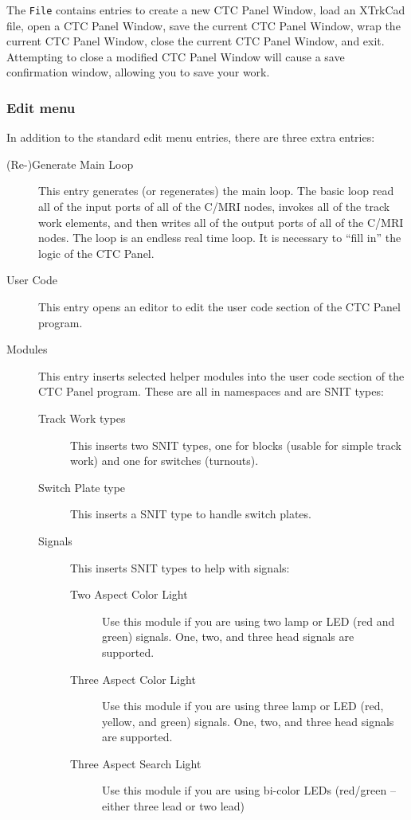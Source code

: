 The \verb=File= contains entries to create a new CTC Panel Window, load
an XTrkCad file, open a CTC Panel Window, save the current CTC Panel
Window, wrap the current CTC Panel Window, close the current CTC Panel
Window, and exit.  Attempting to close a modified CTC Panel Window will
cause a save confirmation window, allowing you to save your work.

\subsubsection{Edit menu}

In addition to the standard edit menu entries, there are three extra
entries:

\begin{description}
  \item[(Re-)Generate Main Loop] This entry generates (or regenerates)
the main loop.  The basic loop read all of the input ports of all of the
C/MRI nodes, invokes all of the track work elements, and then writes all
of the output ports of all of the C/MRI nodes.  The loop is an endless
real time loop.  It is necessary to ``fill in'' the logic of the CTC Panel.
  \item[User Code] This entry opens an editor to edit the user code
section of the CTC Panel program.
  \item[Modules] This entry inserts selected helper modules into the
user code section of the CTC Panel program.  These are all in namespaces
and are SNIT types:
    \begin{description}
      \item[Track Work types] This inserts two SNIT types, one for
blocks (usable for simple track work) and one for switches (turnouts).
      \item[Switch Plate type] This inserts a SNIT type to handle switch
plates. 
      \item[Signals] This inserts SNIT types to help with signals:
	\begin{description}
	   \item[Two Aspect Color Light] Use this module if you are
using two lamp or LED (red and green) signals.  One, two, and three head
signals are supported.
	   \item[Three Aspect Color Light] Use this module if you are
using three  lamp or LED (red,  yellow,  and green) signals.  One, two,
and three head signals are supported.
	   \item[Three Aspect Search Light] Use this module if you are 
using bi-color LEDs (red/green -- either three lead or two lead)

\end{description}
\end{description}
\end{description}

